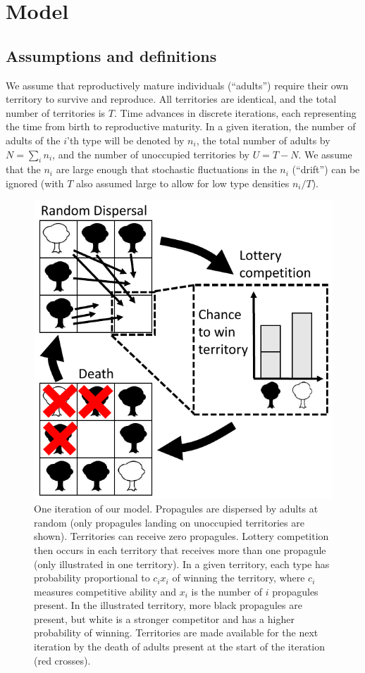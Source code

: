 \documentclass[12pt]{article}
\begin{document}
\section*{Model}\label{sec:model}

\subsection*{Assumptions and definitions} 

We assume that reproductively mature individuals (``adults'') require their own territory to survive and reproduce. All territories are identical, and the total number of territories is $T$. Time advances in discrete iterations, each representing the time from birth to reproductive maturity. In a given iteration, the number of adults of the $i$'th type will be denoted by $n_i$, the total number of adults by $N=\sum_i n_i$, and the number of unoccupied territories by $U=T-N$. We assume that the $n_i$ are large enough that stochastic fluctuations in the $n_i$ (``drift'') can be ignored (with $T$ also assumed large to allow for low type densities $n_i/T$).

\begin{figure}
\centering
\includegraphics[scale=0.8]{lottery.pdf}
\caption{\label{fig:lottery} One iteration of our model. Propagules are dispersed by adults at random (only propagules landing on unoccupied territories are shown). Territories can receive zero propagules. Lottery competition then occurs in each territory that receives more than one propagule (only illustrated in one territory). In a given territory, each type has probability proportional to $c_i x_i$ of winning the territory, where $c_i$ measures competitive ability and $x_i$ is the number of $i$ propagules present. In the illustrated territory, more black propagules are present, but white is a stronger competitor and has a higher probability of winning. Territories are made available for the next iteration by the death of adults present at the start of the iteration (red crosses).}
\end{figure}
\end{document}
